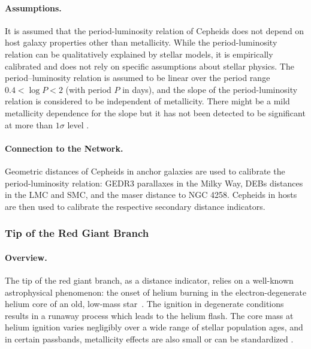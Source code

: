 \paragraph{Assumptions.}

It is assumed that the period-luminosity relation of Cepheids does not depend on host galaxy properties other than metallicity. While the period-luminosity relation can be qualitatively explained by stellar models, it is empirically calibrated and does not rely on specific assumptions about stellar physics. The period–luminosity relation is assumed to be linear over the period range $0.4 < \log P < 2$ (with period $P$ in days), and the slope of the period-luminosity relation is considered to be independent of metallicity. There might be a mild metallicity dependence for the slope but it has not been detected to be significant at more than $1\sigma$ level \citep{2024A&A...690A.246T}.

\paragraph{Connection to the Network.}
Geometric distances of Cepheids in anchor galaxies are used to calibrate the period-luminosity relation: GEDR3 parallaxes in the Milky Way, DEBs distances in the LMC and SMC, and the maser distance to NGC 4258. Cepheids in hosts are then used to calibrate the respective secondary distance indicators. 

\subsubsection{Tip of the Red Giant Branch} \label{trgb-data}

\paragraph{Overview.}
The tip of the red giant branch, as a distance indicator, relies on a well-known astrophysical phenomenon: the onset of helium burning in the electron-degenerate helium core of an old, low-mass star~\citep{2017A&A...606A..33S}. The ignition in degenerate conditions results in a runaway process which leads to the helium flash. The core mass at helium ignition varies negligibly over a wide range of stellar population ages, and in certain passbands, metallicity effects are also small or can be standardized \citep{2017A&A...606A..33S, 2018SSRv..214..113B, 2019ApJ...880...63M}. 


